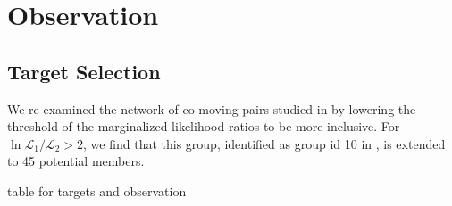 \documentclass[modern,letterpaper]{aastex61}
\begin{document}

\section{Observation}
\label{sec:observation}

\subsection{Target Selection}
\label{sub:target_selection}

We re-examined the network of co-moving pairs studied in \citealt{2017AJ....153..257O} by
lowering the threshold of the marginalized likelihood ratios to be more inclusive.
For $\ln{\mathcal{L}_1}/{\mathcal{L}_2}>2$, we find that this group,
identified as group id 10 in \citealt{2017AJ....153..257O}, is extended to 45 potential members.

table for targets and observation






\end{document}

